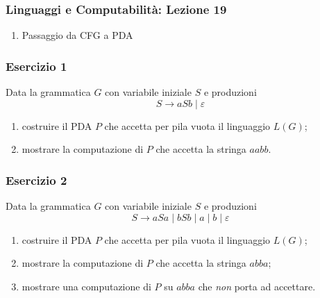




\begin{frame}[fragile]
        \frametitle{Linguaggi e Computabilità: Lezione 19}
\begin{enumerate}
\item
Passaggio da CFG a PDA
\end{enumerate}
\end{frame}


\begin{frame}[fragile]
        \frametitle{Esercizio 1}
Data la grammatica $G$ con variabile iniziale $S$ e produzioni
\[
S \to aSb \mid \varepsilon
\]
\begin{enumerate}
\item costruire il PDA $P$ che accetta per pila vuota il linguaggio $L(G)$;
\item mostrare la computazione di $P$ che accetta la stringa $aabb$.
\end{enumerate}
\end{frame}


\begin{frame}[fragile]
        \frametitle{Esercizio 2}
Data la grammatica $G$ con variabile iniziale $S$ e produzioni
\[
S \to aSa \mid bSb \mid a \mid b \mid \varepsilon
\]
\begin{enumerate}
\item costruire il PDA $P$ che accetta per pila vuota il linguaggio $L(G)$;
\item mostrare la computazione di $P$ che accetta la stringa $abba$;
\item mostrare una computazione di $P$ su $abba$ che \emph{non} porta ad accettare.
\end{enumerate}
\end{frame}


